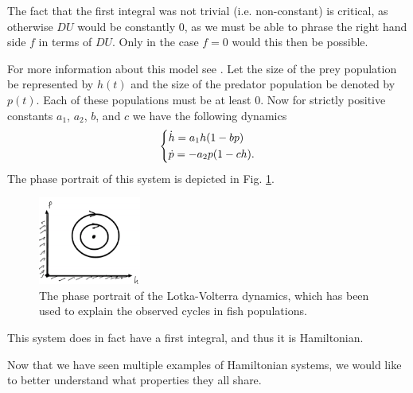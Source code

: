 \begin{remark}[]
	The fact that the first integral was not trivial (i.e. non-constant) is critical, as otherwise $DU$ would be constantly 0, as we must be able to phrase the right hand side $f$ in terms of $DU$. Only in the case $f=0$ would this then be possible.
\end{remark}

\begin{ex}
	For more information about this model see \cite{Lotka1925, Volterra1926}. Let the size of the prey population be represented by $h(t)$ and the size of the predator population be denoted by $p(t)$. Each of these populations must be at least 0. Now for strictly positive constants $a_1$, $a_2$, $b$, and $c$ we have the following dynamics
	\begin{align}
		\begin{dcases}
			\dot{h} = a_1 h(1- bp) \\
			\dot{p} = -a_2 p(1-ch).
		\end{dcases}
	\end{align}
	The phase portrait of this system is depicted in Fig. \ref{fig:lotka_volterra}.
	\begin{figure}[h!]
		\centering
		\includegraphics[width=0.3\textwidth]{figures/ch8/3lotka_volterra.png}
		\caption{The phase portrait of the Lotka-Volterra dynamics, which has been used to explain the observed cycles in fish populations.}
		\label{fig:lotka_volterra}
	\end{figure}

	This system does in fact have a first integral, and thus it is Hamiltonian.	
\end{ex}

Now that we have seen multiple examples of Hamiltonian systems, we would like to better understand what properties they all share.

